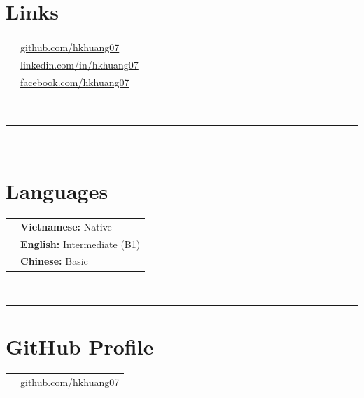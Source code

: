 \documentclass[oneside]{article}
\begin{document}
{\begin{minipage}[t][\textheight-2\fboxsep-2\fboxrule][t]{\dimexpr0.40\textwidth-2\fboxrule-2\fboxsep\relax}
        \section*{\large Links}
        \begin{tabular}{cl}
            \faGithub{}   & \href{https://github.com/hkhuang07}{github.com/hkhuang07} \\
            \faLinkedin{} & \href{https://www.linkedin.com/in/hkhuang07/}{linkedin.com/in/hkhuang07} \\
            \faFacebook{}     & \href{https://https://www.facebook.com/hk.huang07}{facebook.com/hkhuang07} \\
        \end{tabular}
        \vspace{10pt} \\
        \rule{\linewidth}{0.4pt} \\
        \section*{\large Languages}
        \begin{tabular}{cl}
            \faLanguage{} & \textbf{Vietnamese:} Native \\
            \faLanguage{} & \textbf{English:} Intermediate (B1) \\
            \faLanguage{} & \textbf{Chinese:} Basic \\
        \end{tabular}
        \vspace{.3cm}
        \\
        \rule{\linewidth}{0.4pt}
        \section*{\large GitHub Profile}
        \begin{tabular}{cl}
            \faGithub{} & \href{https://github.com/hkhuang07}{github.com/hkhuang07} \\
        \end{tabular}
        \vspace{.3cm}
        

\end{minipage}}
\end{document}
